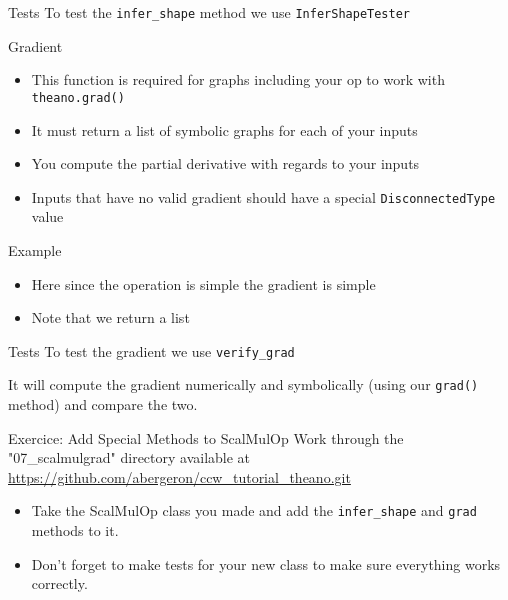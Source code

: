 \documentclass[utf8x]{beamer}
\newcommand{\code}[1]{\lstinline[emph={[2]}]|#1|}
\begin{document}
\begin{frame}{Tests}
To test the \code{infer_shape} method we use \code{InferShapeTester}

\end{frame}

\begin{frame}{Gradient}

\begin{itemize}
\item This function is required for graphs including your op to work with \code{theano.grad()}
\item It must return a list of symbolic graphs for each of your inputs
\item You compute the partial derivative with regards to your inputs
\item Inputs that have no valid gradient should have a special \code{DisconnectedType} value
\end{itemize}
\end{frame}

\begin{frame}{Example}

\begin{itemize}
\item Here since the operation is simple the gradient is simple
\item Note that we return a list
\end{itemize}
\end{frame}

\begin{frame}{Tests}
To test the gradient we use \code{verify_grad}

It will compute the gradient numerically and symbolically (using our \code{grad()} method) and compare the two.
\end{frame}

\begin{frame}{Exercice: Add Special Methods to ScalMulOp}
Work through the "07\_scalmulgrad" directory available at \url{https://github.com/abergeron/ccw_tutorial_theano.git}
\begin{itemize}
\item Take the ScalMulOp class you made and add the \code{infer_shape} and \code{grad} methods to it.
\item Don't forget to make tests for your new class to make sure everything works correctly.
\end{itemize}
\end{frame}
\end{document}
